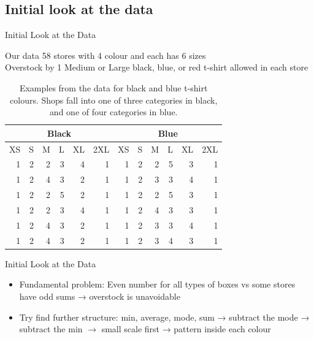 \documentclass{beamer}
\begin{document}
\subsection{Initial look at the data}

\begin{frame}{Initial Look at the Data}
\begin{block}{Our data}
	58 stores with 4 colour and each has 6 sizes\\
	Overstock by 1 Medium or Large black, blue, or red t-shirt allowed in each store
\end{block}
\begin{table}[htbp]
\begin{center}
\begin{tabular}{|r|r|r|r|r|r|r|r|r|r|r|r|}
\hline
\multicolumn{6}{|c|}{Black} & \multicolumn{6}{|c|}{Blue} \\ \hline
\multicolumn{1}{|l|}{XS} & \multicolumn{1}{l|}{S} &
\multicolumn{1}{l|}{M} &
\multicolumn{1}{l|}{L} &
\multicolumn{1}{l|}{XL} & \multicolumn{1}{l|}{2XL} &
\multicolumn{1}{l|}{XS} & \multicolumn{1}{l|}{S} & \multicolumn{1}{l|}{M} &
\multicolumn{1}{l|}{L} & \multicolumn{1}{l|}{XL} & \multicolumn{1}{l|}{2XL} \\
\hline
1 & 2 & 2 & 3 & 4 & 1 & 1 & 2 & 2 & 5 & 3 & 1 \\ \hline
1 & 2 & 4 & 3 & 2 & 1 & 1 & 2 & 3 & 3 & 4 & 1 \\ \hline
1 & 2 & 2 & 5 & 2 & 1 & 1 & 2 & 2 & 5 & 3 & 1 \\ \hline
1 & 2 & 2 & 3 & 4 & 1 & 1 & 2 & 4 & 3 & 3 & 1 \\ \hline
1 & 2 & 4 & 3 & 2 & 1 & 1 & 2 & 3 & 3 & 4 & 1 \\ \hline
1 & 2 & 4 & 3 & 2 & 1 & 1 & 2 & 3 & 4 & 3 & 1 \\ \hline
\end{tabular}
\end{center}
\caption{Examples from the data for black and blue t-shirt colours. Shops fall into one of three categories in black, and one of four categories in blue.}
\label{}
\end{table}
\end{frame}

\begin{frame}{Initial Look at the Data}
    \begin{itemize}
        \item Fundamental problem:
        Even number for all types of boxes vs some stores have odd sums → overstock is unavoidable
        \item Try find further structure:
        min, average, mode, sum → subtract the mode → subtract the min $\rightarrow$ small scale first → pattern inside each colour
    \end{itemize}
\end{frame}
\end{document}
